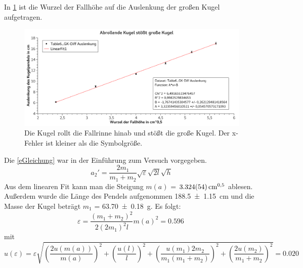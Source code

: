 \documentclass[
	a4paper,
	12pt,
	pagesize,
	ngerman
]{scrartcl}
\begin{document}
	In \cref{GraphRKaufGK} ist die Wurzel der Fallhöhe auf die Auslenkung der großen Kugel aufgetragen. %
	\begin{figure}[htb]
	  \centering
	    \includegraphics[width=1.0\textwidth]{StossRKaufGK} %
	  \caption{Die Kugel rollt die Fallrinne hinab und stößt die große Kugel. Der x-Fehler ist kleiner als die Symbolgröße.}
		\label{GraphRKaufGK}
	\end{figure}
	Die \cref{eGleichung} war in der Einführung zum Versuch vorgegeben.
	\begin{equation}
		\label{eGleichung}
		a_2' = \frac{2m_1}{m_1+m_2} \sqrt{\varepsilon} \sqrt{2 l} \sqrt{h}
	\end{equation}
	Aus dem linearen Fit kann man die Steigung $m(a)$ = $\SI{3,324 \pm 0,054}{cm^{0,5}}$ ablesen. Außerdem wurde die Länge des Pendels aufgenommen \SI{188,5 \pm 1,15}{cm} und die Masse der Kugel beträgt $m_1$ = \SI{63,70 \pm 0,18}{g}. Es folgt:
	\begin{equation}
		\varepsilon = \frac{(m_1+m_2)^2}{2(2m_1)^2l} m(a)^2 = \SI{0,596}{} %
	\end{equation}
	mit
	\begin{equation}
		u(\varepsilon) = \varepsilon\sqrt{ \left(\frac{2u(m(a))}{m(a)}\right)^2  + \left(\frac{u(l)}{l}\right)^2 + \left(\frac{u(m_1)2m_2}{m_1 (m_1+m_2)}\right)^2 + \left(\frac{2u(m_2)}{m_1+m_2}\right)^2} = \SI{0,020}{}
	\end{equation}
\end{document}
